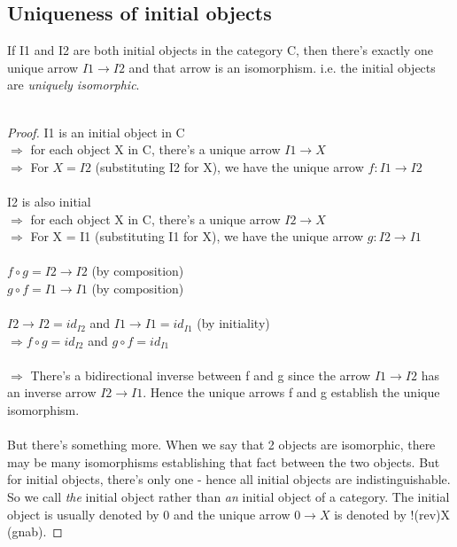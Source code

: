 \documentclass{article}
\begin{document}
\subsection{Uniqueness of initial objects}

If I1 and I2 are both initial objects in the category C, then there's exactly one unique arrow $I1 \rightarrow I2$ and that arrow is an isomorphism. i.e. the initial objects are \textit{uniquely isomorphic}. \\ \\
\begin{proof}
I1 is an initial object in C \\
$\Rightarrow$ for each object X in C, there's a unique arrow $I1 \rightarrow X$ \\
$\Rightarrow$ For $X = I2$ (substituting I2 for X), we have the unique arrow $f: I1 \rightarrow I2$ \\ \\
I2 is also initial \\
$\Rightarrow$ for each object X in C, there's a unique arrow $I2 \rightarrow X$ \\
$\Rightarrow$ For X = I1 (substituting I1 for X), we have the unique arrow $g: I2 \rightarrow I1$ \\ \\
$f \circ g = I2 \rightarrow I2$ (by composition) \\
$g \circ f = I1 \rightarrow I1$ (by composition) \\ \\
$I2 \rightarrow I2 = id_{I2}$ and $I1 \rightarrow I1 = id_{I1}$ (by initiality) \\
$\Rightarrow f \circ g = id_{I2}$ and $g \circ f = id_{I1}$ \\ \\
$\Rightarrow$ There's a bidirectional inverse between f and g since the arrow $I1 \rightarrow I2$ has an inverse arrow $I2 \rightarrow I1$. Hence the unique arrows f and g establish the unique isomorphism. \\ \\
But there's something more. When we say that 2 objects are isomorphic, there may be many isomorphisms establishing that fact between the two objects. But for initial objects, there's only one - hence all initial objects are indistinguishable. So we call \textit{the} initial object rather than \textit{an} initial object of a category. The initial object is usually denoted by 0 and the unique arrow $0 \rightarrow X$ is denoted by !(rev)X (gnab).
\end{proof}
\end{document}
